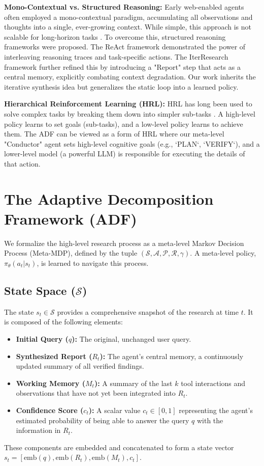 \documentclass{article}
\begin{document}
\textbf{Mono-Contextual vs. Structured Reasoning:} Early web-enabled agents often employed a mono-contextual paradigm, accumulating all observations and thoughts into a single, ever-growing context. While simple, this approach is not scalable for long-horizon tasks \cite{qiao2025webresearcher}. To overcome this, structured reasoning frameworks were proposed. The ReAct framework \cite{yao2022react} demonstrated the power of interleaving reasoning traces and task-specific actions. The IterResearch framework \cite{qiao2025webresearcher} further refined this by introducing a "Report" step that acts as a central memory, explicitly combating context degradation. Our work inherits the iterative synthesis idea but generalizes the static loop into a learned policy.

\textbf{Hierarchical Reinforcement Learning (HRL):} HRL has long been used to solve complex tasks by breaking them down into simpler sub-tasks \cite{barto2003recent}. A high-level policy learns to set goals (sub-tasks), and a low-level policy learns to achieve them. The ADF can be viewed as a form of HRL where our meta-level "Conductor" agent sets high-level cognitive goals (e.g., `PLAN`, `VERIFY`), and a lower-level model (a powerful LLM) is responsible for executing the details of that action.

\section{The Adaptive Decomposition Framework (ADF)}
We formalize the high-level research process as a meta-level Markov Decision Process (Meta-MDP), defined by the tuple $(\mathcal{S}, \mathcal{A}, \mathcal{P}, \mathcal{R}, \gamma)$. A meta-level policy, $\pi_\theta(a_t | s_t)$, is learned to navigate this process.

\subsection{State Space ($\mathcal{S}$)}
The state $s_t \in \mathcal{S}$ provides a comprehensive snapshot of the research at time $t$. It is composed of the following elements:
\begin{itemize}
    \item \textbf{Initial Query ($q$):} The original, unchanged user query.
    \item \textbf{Synthesized Report ($R_t$):} The agent's central memory, a continuously updated summary of all verified findings.
    \item \textbf{Working Memory ($M_t$):} A summary of the last $k$ tool interactions and observations that have not yet been integrated into $R_t$.
    \item \textbf{Confidence Score ($c_t$):} A scalar value $c_t \in [0, 1]$ representing the agent's estimated probability of being able to answer the query $q$ with the information in $R_t$.
\end{itemize}
These components are embedded and concatenated to form a state vector $s_t = [\text{emb}(q), \text{emb}(R_t), \text{emb}(M_t), c_t]$.
\end{document}
